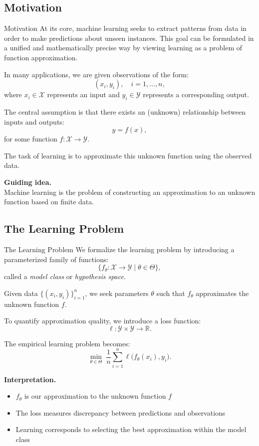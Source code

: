\documentclass[aspectratio=169,11pt]{beamer}
\begin{document}
\subsection{Motivation}
\begin{frame}[t,allowframebreaks]{Motivation}
\small
At its core, machine learning seeks to extract patterns from data in order to make predictions about unseen instances. This goal can be formulated in a unified and mathematically precise way by viewing learning as a problem of function approximation.

In many applications, we are given observations of the form:
\[
(x_i, y_i), \quad i = 1, \dots, n,
\]
where $x_i \in \mathcal{X}$ represents an input and $y_i \in \mathcal{Y}$ represents a corresponding output.

The central assumption is that there exists an (unknown) relationship between inputs and outputs:
\[
y = f(x),
\]
for some function $f : \mathcal{X} \to \mathcal{Y}$.

The task of learning is to approximate this unknown function using the observed data.

\textbf{Guiding idea.}\\ Machine learning is the problem of constructing an approximation to an unknown function based on finite data.
\end{frame}

\subsection{The Learning Problem}
\begin{frame}[t,allowframebreaks]{The Learning Problem}
\small
We formalize the learning problem by introducing a parameterized family of functions:
\[
\{ f_\theta : \mathcal{X} \to \mathcal{Y} \mid \theta \in \Theta \},
\]
called a \emph{model class} or \emph{hypothesis space}.

Given data $\{(x_i, y_i)\}_{i=1}^n$, we seek parameters $\theta$ such that $f_\theta$ approximates the unknown function $f$.

To quantify approximation quality, we introduce a loss function:
\[
\ell : \mathcal{Y} \times \mathcal{Y} \to \mathbb{R}.
\]

The empirical learning problem becomes:
\[
\min_{\theta \in \Theta} \; \frac{1}{n} \sum_{i=1}^n \ell\big(f_\theta(x_i), y_i\big).
\]

\textbf{Interpretation.}\\ \begin{itemize}
    \item $f_\theta$ is our approximation to the unknown function $f$
    \item The loss measures discrepancy between predictions and observations
    \item Learning corresponds to selecting the best approximation within the model class
\end{itemize}
\end{frame}
\end{document}
